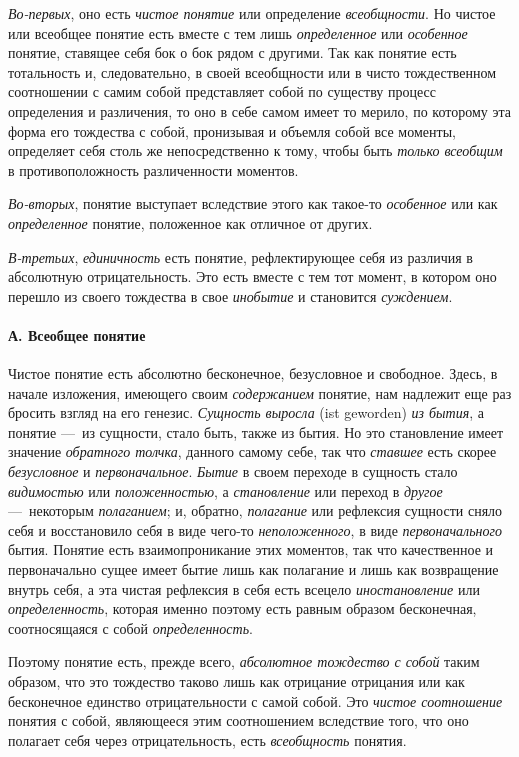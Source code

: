 \documentclass[twoside]{article}
\begin{document}
{{{\em Во-первых}, оно есть
{\em чистое понятие} или
определение {\em всеобщности}.
Но чистое или всеобщее понятие есть вместе с тем лишь
{\em определенное} или
{\em особенное} понятие,
ставящее себя бок о бок рядом с другими. Так как понятие есть тотальность
и, следовательно, в своей всеобщности или в чисто тождественном соотношении
с самим собой представляет собой по существу процесс определения и
различения, то оно в себе самом имеет то мерило, по которому эта форма его
тождества с собой, пронизывая и объемля собой все моменты, определяет себя
столь же непосредственно к тому, чтобы быть
{\em только всеобщим }в
противоположность различенности моментов.

{\em Во-вторых}, понятие
выступает вследствие этого как такое-то
{\em особенное} или как
{\em определенное}
понятие, положенное как отличное от других.

{\em В-третьих},
{\em единичность} есть
понятие, рефлектирующее себя из различия в абсолютную отрицательность. Это
есть вместе с тем тот момент, в котором оно перешло из своего тождества в
свое {\em инобытие} и
становится {\em суждением}. 

\paragraph[А. Всеобщее понятие]{А. Всеобщее понятие}
Чистое понятие есть абсолютно бесконечное, безусловное и
свободное. Здесь, в начале изложения, имеющего своим
{\em содержанием}
понятие, нам надлежит еще раз бросить взгляд на его генезис.
{\em Сущность выросла} (ist geworden)
{\em из бытия}, а понятие
—~из сущности, стало быть, также из бытия. Но это становление
имеет значение {\em обратного толчка},
данного самому себе, так что
{\em ставшее} есть скорее
{\em безусловное} и
{\em первоначальное}.
{\em Бытие} в своем
переходе в сущность стало
{\em видимостью} или
{\em положенностью}, а
{\em становление} или
переход в {\em другое}
—~некоторым
{\em полаганием}; и,
обратно, {\em полагание}
или рефлексия сущности сняло себя и восстановило себя в виде
чего-то {\em неположенного},
в виде
{\em первоначального}
бытия. Понятие есть взаимопроникание этих моментов, так что
качественное и первоначально сущее имеет бытие лишь как полагание и лишь
как возвращение внутрь себя, а эта чистая рефлексия в себя есть
всецело {\em иностановление}
или {\em определенность},
которая именно поэтому есть равным образом бесконечная,
соотносящаяся с собой
{\em определенность}.

Поэтому понятие есть, прежде всего,
{\em абсолютное тождество с собой}
таким образом, что это тождество таково лишь как отрицание
отрицания или как бесконечное единство отрицательности с самой собой. Это
{\em чистое соотношение}
понятия с собой, являющееся этим соотношением вследствие
того, что оно полагает себя через отрицательность, есть
{\em всеобщность}
понятия.

}}
\end{document}
